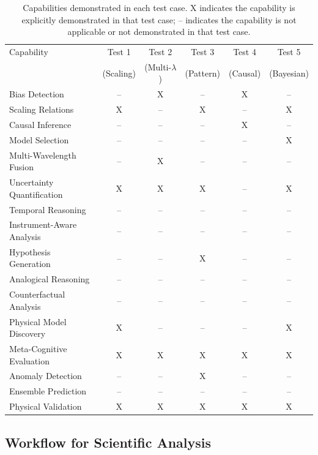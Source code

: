 \documentclass[usenatbib]{rasti}
\begin{document}
\begin{table}
\centering
\begin{tabular}{lccccc}
\hline
Capability & Test 1 & Test 2 & Test 3 & Test 4 & Test 5 \\
& (Scaling) & (Multi-$\lambda$) & (Pattern) & (Causal) & (Bayesian) \\
\hline
Bias Detection & -- & X & -- & X & -- \\
Scaling Relations & X & -- & X & -- & X \\
Causal Inference & -- & -- & -- & X & -- \\
Model Selection & -- & -- & -- & -- & X \\
Multi-Wavelength Fusion & -- & X & -- & -- & -- \\
Uncertainty Quantification & X & X & X & -- & X \\
Temporal Reasoning & -- & -- & -- & -- & -- \\
Instrument-Aware Analysis & -- & -- & -- & -- & -- \\
Hypothesis Generation & -- & -- & X & -- & -- \\
Analogical Reasoning & -- & -- & -- & -- & -- \\
Counterfactual Analysis & -- & -- & -- & -- & -- \\
Physical Model Discovery & X & -- & -- & -- & X \\
Meta-Cognitive Evaluation & X & X & X & X & X \\
Anomaly Detection & -- & -- & X & -- & -- \\
Ensemble Prediction & -- & -- & -- & -- & -- \\
Physical Validation & X & X & X & X & X \\
\hline
\end{tabular}
\caption{Capabilities demonstrated in each test case. X indicates the capability is explicitly demonstrated in that test case; -- indicates the capability is not applicable or not demonstrated in that test case.}
\label{tab:capabilities}
\end{table}

\subsection{Workflow for Scientific Analysis}
\end{document}
